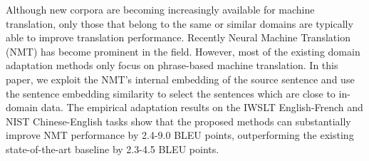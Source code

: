 Although new corpora are becoming increasingly available for machine translation, only those that belong to the same or similar domains are typically able to improve translation performance. Recently Neural Machine Translation (NMT) has become prominent in the field. However, most of the existing domain adaptation methods only focus on phrase-based machine translation. In this paper, we exploit the NMT's internal embedding of the source sentence and use the sentence embedding similarity to select the sentences which are close to in-domain data. The empirical adaptation results on the IWSLT English-French and NIST Chinese-English tasks show that the proposed methods can substantially improve NMT performance by 2.4-9.0 BLEU points, outperforming the existing state-of-the-art baseline by 2.3-4.5 BLEU points.

